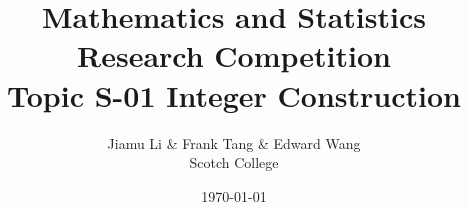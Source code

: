 \usepackage[T1]{fontenc}
\usepackage[utf8]{inputenc}

\usepackage{mathtools, amssymb, amsthm}
\usepackage{parskip}
\usepackage{xcolor}
\usepackage{pgfplotstable}
\pgfplotsset{compat=1.18}
\usepackage{float}
\usepackage{caption}
\usepackage{todonotes}
\usepackage{siunitx}
\usepackage{microtype}
\usepackage[english]{babel}
\usepackage[style=numeric, sorting=none]{biblatex}


\usepackage{bm}
\usepackage{booktabs}
\usepackage{hyperref}
\usepackage{geometry}
\geometry{
  paperwidth=210mm,
  paperheight=297mm,
  textwidth=0.72\paperwidth,
  marginparwidth=2cm,
}
\usepackage[p]{ETbb}
\usepackage[libertine, vvarbb]{newtxmath}
\usepackage[lining, scale = 0.82]{FiraMono}
\usepackage{minted}
\usepackage{csquotes}


\newtheorem{theorem}{Theorem}[section]
\newtheorem{conj}{Conjecture}[section]
\newtheorem{claim}{Claim}[section]
\newtheorem{lemma}{Lemma}[section]
\theoremstyle{definition}
\newtheorem{definition}{Definition}[section]
\newtheorem*{problem}{Problem}

\DeclarePairedDelimiter\abs{\lvert}{\rvert}
\DeclarePairedDelimiter\floor{\lfloor}{\rfloor}
\DeclarePairedDelimiter\ceil{\lceil}{\rceil}

\usetikzlibrary{automata, arrows, positioning, calc, graphs, graphs.standard}

\title{\bfseries Mathematics and Statistics \\ Research Competition \\ Topic S-01 Integer Construction}
\author{Jiamu Li \& Frank Tang \& Edward Wang \\[1em] Scotch College}
\date{\today}

\newcommand\NTen{\ensuremath{\mathcal{N}_{10, 2}}}
\newcommand\LTen{\ensuremath{\mathcal{L}_{10, 2}}}
\newcommand\NN{\ensuremath{\mathcal{N}}}
\newcommand\LL{\ensuremath{\mathcal{L}}}
